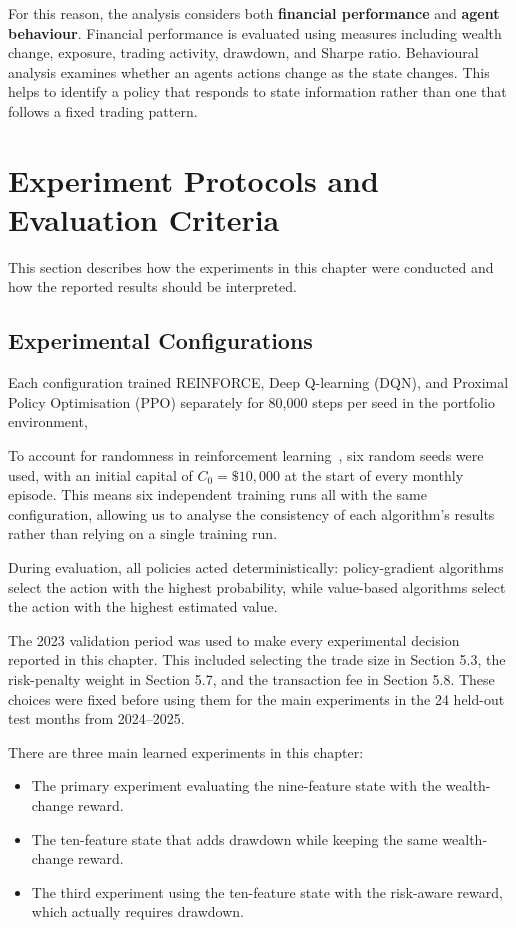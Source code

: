 For this reason, the analysis considers both \textbf{financial
performance} and \textbf{agent behaviour}. Financial performance is
evaluated using measures including wealth change, exposure, trading
activity, drawdown, and Sharpe ratio. Behavioural analysis examines
whether an agent\textquotesingle s actions change as the state changes.
This helps to identify a policy that responds to state information
rather than one that follows a fixed trading pattern.

\section{Experiment Protocols and Evaluation Criteria}

This section describes how the experiments in this chapter were
conducted and how the reported results should be interpreted.

\subsection{Experimental Configurations}

Each configuration trained REINFORCE, Deep Q-learning (DQN), and
Proximal Policy Optimisation (PPO) separately for 80,000 steps per seed
in the portfolio environment,

To account for randomness in reinforcement learning~\cite{henderson2018}, six random seeds
were used, with an initial capital of \(C_{0} = \$ 10,000\) at the start
of every monthly episode. This means six independent training runs all
with the same configuration, allowing us to analyse the consistency of
each algorithm's results rather than relying on a single training run.

During evaluation, all policies acted deterministically: policy-gradient
algorithms select the action with the highest probability, while
value-based algorithms select the action with the highest estimated
value.

The 2023 validation period was used to make every experimental decision
reported in this chapter. This included selecting the trade size in
Section 5.3, the risk-penalty weight in Section 5.7, and the transaction
fee in Section 5.8. These choices were fixed before using them for the
main experiments in the 24 held-out test months from 2024--2025.

There are three main learned experiments in this chapter:

\begin{itemize}
\item
  The primary experiment evaluating the nine-feature state with the
  wealth-change reward.
\item
  The ten-feature state that adds drawdown while keeping the same
  wealth-change reward.
\item
  The third experiment using the ten-feature state with the risk-aware
  reward, which actually requires drawdown.
\end{itemize}

